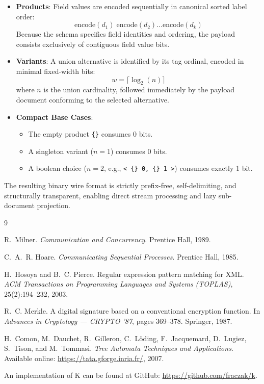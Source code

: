 \documentclass[11pt,a4paper]{article}
\begin{document}
\begin{itemize}
  \item \textbf{Products}: Field values are encoded sequentially in canonical sorted label order:
  \begin{equation}
  \text{encode}(d_1) \; \text{encode}(d_2) \dots \text{encode}(d_k)
  \end{equation}
  Because the schema specifies field identities and ordering, the payload consists exclusively of contiguous field value bits.
  \item \textbf{Variants}: A union alternative is identified by its tag ordinal, encoded in minimal fixed-width bits:
  \begin{equation}
  w = \lceil \log_2(n) \rceil
  \end{equation}
  where $n$ is the union cardinality, followed immediately by the payload document conforming to the selected alternative.
  \item \textbf{Compact Base Cases}:
  \begin{itemize}
    \item The empty product \lstinline|{}| consumes 0 bits.
    \item A singleton variant ($n = 1$) consumes 0 bits.
    \item A boolean choice ($n = 2$, e.g., \lstinline|< {} 0, {} 1 >|) consumes exactly 1 bit.
  \end{itemize}
\end{itemize}

The resulting binary wire format is strictly prefix-free, self-delimiting, and structurally transparent, enabling direct stream processing and lazy sub-document projection.

\begin{thebibliography}{9}

R.~Milner.
\newblock \emph{Communication and Concurrency}.
\newblock Prentice Hall, 1989.

C.~A.~R. Hoare.
\newblock \emph{Communicating Sequential Processes}.
\newblock Prentice Hall, 1985.

H.~Hosoya and B.~C. Pierce.
\newblock Regular expression pattern matching for {XML}.
\newblock \emph{ACM Transactions on Programming Languages and Systems (TOPLAS)}, 25(2):194--232, 2003.

R.~C. Merkle.
\newblock A digital signature based on a conventional encryption function.
\newblock In \emph{Advances in Cryptology --- CRYPTO '87}, pages 369--378. Springer, 1987.

H.~Comon, M.~Dauchet, R.~Gilleron, C.~L{\"o}ding, F.~Jacquemard, D.~Lugiez, S.~Tison, and M.~Tommasi.
\newblock \emph{Tree Automata Techniques and Applications}.
\newblock Available online: \url{https://tata.gforge.inria.fr/}, 2007.

An implementation of K can be found at GitHub: \url{https://github.com/fraczak/k}.

\end{thebibliography}
\end{document}

